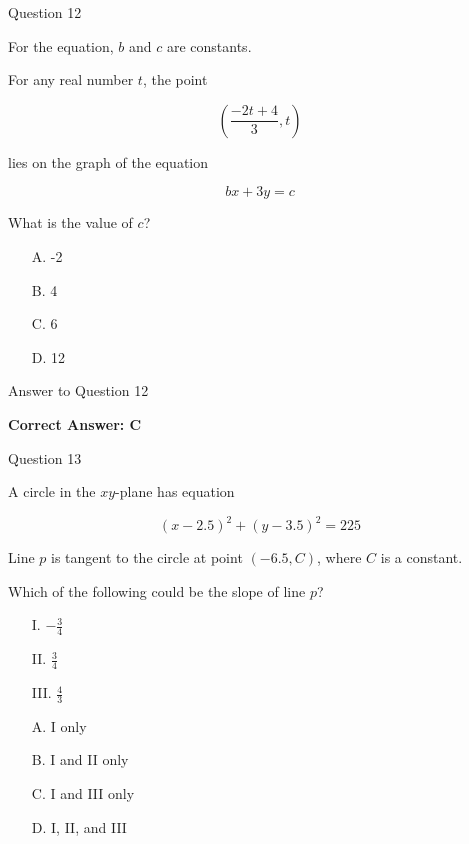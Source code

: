 \documentclass{beamer}
\begin{document}

\begin{frame}{Question 12}

For the equation, $b$ and $c$ are constants.

For any real number $t$, the point

\[
\left(\frac{-2t+4}{3},t\right)
\]

lies on the graph of the equation

\[
bx+3y=c
\]

What is the value of $c$?

\begin{itemize}
    \item[A.] -2
    \item[B.] 4
    \item[C.] 6
    \item[D.] 12
\end{itemize}

\end{frame}

\begin{frame}{Answer to Question 12}

\textbf{Correct Answer: C}

\end{frame}


\begin{frame}{Question 13}

A circle in the $xy$-plane has equation

\[
(x-2.5)^2+(y-3.5)^2=225
\]

Line $p$ is tangent to the circle at point $(-6.5,C)$, where $C$ is a constant.

Which of the following could be the slope of line $p$?

\begin{itemize}
    \item[I.] $-\frac34$
    \item[II.] $\frac34$
    \item[III.] $\frac43$
\end{itemize}

\begin{itemize}
    \item[A.] I only
    \item[B.] I and II only
    \item[C.] I and III only
    \item[D.] I, II, and III
\end{itemize}

\end{frame}
\end{document}
